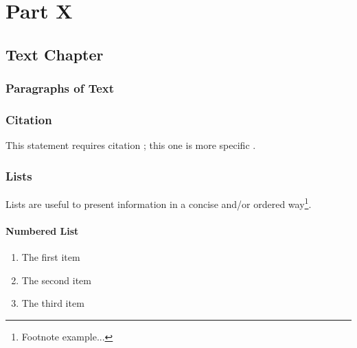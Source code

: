 \documentclass[11pt,fleqn]{book} %
\begin{document}
\part{Part X}



\chapter{Text Chapter}

\section{Paragraphs of Text}

\lipsum[1-7] %


\section{Citation}

This statement requires citation \cite{book_key}; this one is more specific \cite[122]{article_key}.


\section{Lists}

Lists are useful to present information in a concise and/or ordered way\footnote{Footnote example...}.

\subsection{Numbered List}

\begin{enumerate}
\item The first item
\item The second item
\item The third item
\end{enumerate}
\end{document}

